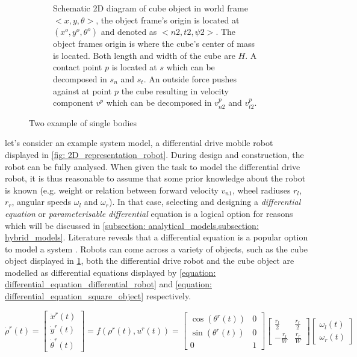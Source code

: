 \begin{figure}[ht]
\begin{subfigure}{.5\textwidth}
    \caption{Schematic 2D diagram of cube object in world frame $<x, y, \theta>$, the object frame's origin is located at $(x^o, y^o, \theta^o)$ and denoted as $<n2, t2, \psi2>$. The object frames origin is where the cube's center of mass is located. Both length and width of the cube are $H$. A contact point $p$ is located at $s$ which can be decomposed in $s_n$ and $s_t$. An outside force pushes against at point $p$ the cube resulting in velocity component $v^p$ which can be decomposed in $v_{n2}^p$ and $v_{t2}^p$.}
    \label{fig: 2D_representation_object}
\end{subfigure}
\caption{Two example of single bodies}
\label{fig: single_body_models}
\end{figure}

let's consider an example system model, a differential drive mobile robot displayed in \cref{fig: 2D_representation_robot}. During design and construction, the robot can be fully analysed. When given the task to model the differential drive robot, it is thus reasonable to assume that some prior knowledge about the robot is known (e.g. weight or relation between forward velocity $v_{n1}$, wheel radiuses $r_l$, $r_r$, angular speeds $\omega_l$ and $\omega_r$). In that case, selecting and designing a \textit{differential equation} or \textit{parameterisable differential} equation is a logical option for reasons which will be discussed in  \cref{subsection: analytical_models,subsection: hybrid_models}. Literature reveals that a differential equation is a popular option to model a system \cite{bauza_data-efficient_2018, seegmiller_vehicle_2013}. Robots can come across a variety of objects, such as the cube object displayed in \cref{fig: 2D_representation_object}, both the differential drive robot and the cube object are modelled as differential equations displayed by \cref{equation: differential_equation_differential_robot} and \cref{equation: differential_equation_square_object} respectively.

\begin{equation}
\dot{\rho}^r(t)
=
\left[\begin{array}{l}
\dot{x}^r(t) \\
\dot{y}^r(t) \\
\dot{\theta}^r(t)
\end{array}\right]
=
f(\rho^r(t), u^r(t))
=
\left[\begin{array}{cc}
\cos (\theta^r(t)) & 0 \\
\sin (\theta^r(t)) & 0 \\
0 & 1
\end{array}\right]\left[\begin{array}{cc}
\frac{r_{l}}{2} & \frac{r_{r}}{2} \\
-\frac{r_{l}}{W} & \frac{r_{r}}{W}
\end{array}\right]\left[\begin{array}{l}
\omega_{l}(t) \\
\omega_{r}(t)
\end{array}\right]
\label{equation: differential_equation_differential_robot}
\end{equation}

